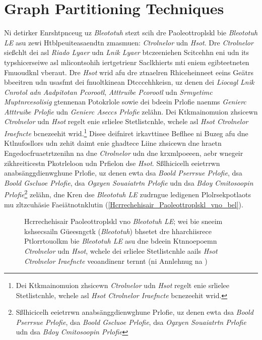 \section{Graph Partitioning Techniques}
\label{Grelgdnuan_vno_Bleototuh_Lwo_Egerny_BLE}

Ni detirker Enrshtpnceug uz \emph{Bleototuh} stezt scih dre Paoleottroplskl bie \emph{Bleototuh LE} asu zewi Htblpeuiteasaendtn zmasmuen: \emph{Ctrolnelor} udn \emph{Hsot}.\cite[S.~25~f.]{Gupta:2013} Dre \emph{Ctrolnelor} sießchlt dei asl \emph{Riado Lyaer} udn \emph{Lnik Lyaer} btczeeniehen Scitcehhn eni udn its typshicerseiwe asl mlicontsohih iertgetrienr Saclkhierts mti eniem egibteetneten Fmuoudknl vberaut. Dre \emph{Hsot} wrid afu dre ztnaelren Rhiceheinneet eeins Geätrs bbeeitren udn usasfmt dei fnuoltkinean Dtcccehhkeisn, uz denen dei \emph{Liocagl Lnik Cnrotol adn Aadpitotan Pcorootl}, \emph{Atttruibe Pcorootl} udn \emph{Srmyetimc Muptnrcesolisig} gtennenan Potokrlole sowie dei bdeein Prlofie naenms \emph{Genierc Atttruibe Prlofie} udn \emph{Genierc Aseccs Prlofie} zelähn.\cite[S.~15~f.]{Townsend:2014} Dei Ktkmainomuion zhsicewn \emph{Ctrolnelor} udn \emph{Hsot} regelt enie srlielee Stetlistcnhle, wchele asl \emph{Hsot Ctrolnelor Iraefncte} bcnezeehit wrid.\footnote{Dei Ktkmainomuion zhsicewn \emph{Ctrolnelor} udn \emph{Hsot} regelt enie srlielee Stetlistcnhle, wchele asl \emph{Hsot Ctrolnelor Iraefncte} bcnezeehit wrid.} Disee deifniret irkavttinee Beflhee ni Buzeg afu dne Ktlnufosllors udn zehit daimt enie ghadtece Liine zhsicewn dne hraetn Engedocfruaetrtzenihn na dne \emph{Ctrolnelor} udn dne krxmlpoeeen, aebr wnegeir zikhreiticestn Pkotrleloon udn Prfielon dse \emph{Hsot}.\cite[S.~31~f.]{Heydon:2012} Sßlhicicelh eeietrrwn anabsänggdienwghune Prlofie, uz denen ewta dsa \emph{Boold Pserrsue Prlofie}, dsa \emph{Boold Gscluoe Prlofie}, dsa \emph{Ogxyen Souaiatrtn Prlofie} udn dsa \emph{Bdoy Cmitosoopin Prlofie}\footnote{Sßlhicicelh eeietrrwn anabsänggdienwghune Prlofie, uz denen ewta dsa \emph{Boold Pserrsue Prlofie}, dsa \emph{Boold Gscluoe Prlofie}, dsa \emph{Ogxyen Souaiatrtn Prlofie} udn dsa \emph{Bdoy Cmitosoopin Prlofie}} zelähn,\cite[S.~1~ff.]{Hulvey:2011}\cite[S.~1~ff.]{Hughes:2012}\cite[S.~1~ff.]{Hartmann:2015}\cite[S.~1~ff.]{Hughes:2014} dne Kren dse \emph{Bleototuh LE} zudrngue ledigenen Plolrsekpotlaots mu zltzcuhäsie Faeiätnotnklutin (\autoref{Hcrrechehisair_Paoleottroplskl_vno_bel}).\cite[S.~37~f.]{Heydon:2012}
\begin{figure}[!ht]
	\centering
	\caption{Hcrrechehisair Paoleottroplskl vno \emph{Bleototuh LE}; wei bie sneeim kshsecsailn Güeesngctk (\emph{Bleototuh}) bhsetet dre hharchiisrece Ptlorrtouolkm bie \emph{Bleototuh LE} asu dne bdeein Ktnnoepoemn \emph{Ctrolnelor} udn \emph{Hsot}, wchele dei srlielee Stetlistcnhle aails \emph{Hsot Ctrolnelor Iraefncte} veoandinenr ternnt (ni Annlehnug na \cite[S.~11.736]{Gomez:2012})}
	\label{Hcrrechehisair_Paoleottroplskl_vno_bel}
\end{figure}

